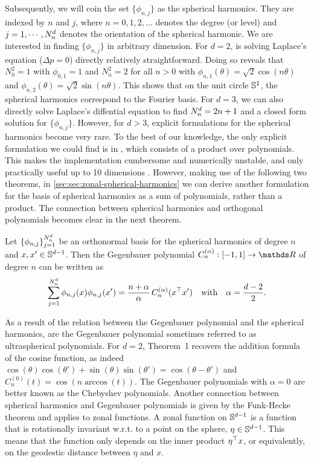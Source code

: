 Subsequently, we will coin the set $\{\phi_{n,j}\}$ as the spherical harmonics. They are indexed by $n$ and $j$, where $n=0,1,2,\ldots$ denotes the degree (or level) and $j=1,\cdots,N^d_n$ denotes the orientation of the spherical harmonic. We are interested in finding $\{\phi_{n,j}\}$ in arbitrary dimension. For $d=2$, is solving Laplace's equation ($\Delta p = 0$) directly relatively straightforward. Doing so reveals that $N^{2}_0 = 1$ with $\phi_{0, 1} = 1$ and $N^{2}_n = 2$ for all $n > 0$ with $\phi_{n, 1}(\theta) = \sqrt{2} \cos(n \theta)$ and $\phi_{n, 2}(\theta) = \sqrt{2} \sin(n \theta)$. This shows that on the unit circle $\mathbb{S}^1$, the spherical harmonics correspond to the Fourier basis. For $d=3$, we can also directly solve Laplace's diffential equation to find $N^d_n = 2n + 1$ and a closed form solution for $\{\phi_{n,j}\}$. However, for $d > 3$, explicit formulations for the spherical harmonics become very rare. To the best of our knowledge, the only explicit formulation we could find is in \citet[Theorem~5.1]{dai2013}, which consists of a product over polynomials. This makes the implementation cumbersome and numerically unstable, and only practically useful up to 10 dimensions \citep{Dutordoir2020spherical}. However, making use of the following two theorems, in \cref{sec:sec:zonal-spherical-harmonics} we can derive another formulation for the basis of spherical harmonics as a sum of polynomials, rather than a product. The connection between spherical harmonics and orthogonal polynomials becomes clear in the next theorem.
\begin{theorem}[Addition]
    \label{theorem:addition}
    Let $\{\phi_{n,j}\}_{j=1}^{N^d_n}$ be an orthonormal basis for the spherical harmonics of degree $n$ and $x,x' \in \mathbb{S}^{d-1}$. Then the Gegenbauer polynomial $C_n^{(\alpha)}: [-1, 1] \rightarrow \Reals$ of degree $n$ can be written as
\begin{equation}
    \sum_{j=1}^{N^d_n} \phi_{n, j}(x) \phi _{n, j}(x') = \frac{n + \alpha}{\alpha}\,
    C_n^{(\alpha)}(x^{\top} x')\quad\text{with}\quad \alpha = \frac{d-2}{2}.
\end{equation}
\end{theorem}
As a result of the relation between the Gegenbauer polynomial and the spherical harmonics, are the Gegenbauer polynomial sometimes referred to as ultraspherical polynomials. For $d=2$, Theorem~1 recovers the addition formula of the cosine function, as indeed $\cos(\theta) \cos(\theta') + \sin(\theta) \sin(\theta') = \cos(\theta - \theta')$ and $C_n^{(0)}(t) = \cos(n \arccos(t))$. The Gegenbauer polynomials with $\alpha=0$ are better known as the Chebyshev polynomials. Another connection between spherical harmonics and Gegenbauer polynomials is given by the Funk-Hecke theorem and applies to zonal functions. A zonal function on $\mathbb{S}^{d-1}$ is a function that is rotationally invariant w.r.t. to a point on the sphere, $\eta \in \mathbb{S}^{d-1}$. This means that the function only depends on the inner product $\eta^{\top} x$, or equivalently, on the geodestic distance between $\eta$ and $x$.

